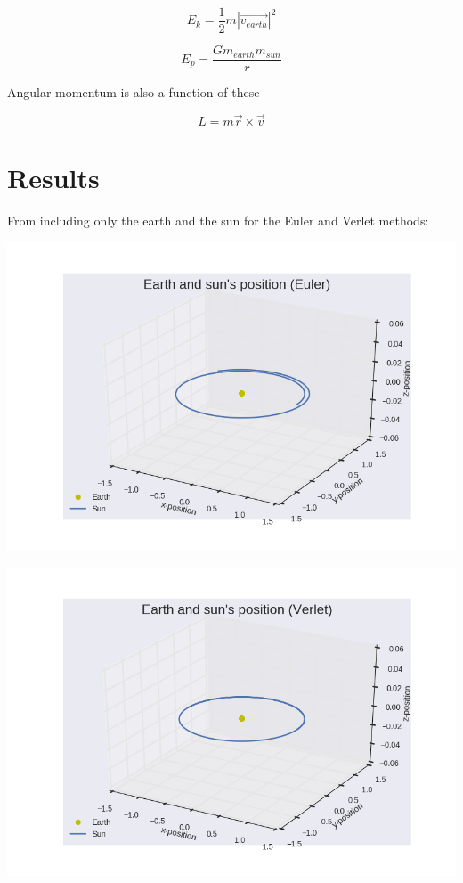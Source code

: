 \documentclass[11pt]{article}
\begin{document}
\begin{flushleft}
\begin{flushleft}
\begin{equation}
E_k = \frac{1}{2} m |\vec{v_{earth}}|^2
\end{equation}

\begin{equation}
E_p = \frac{G m_{earth} m_{sun}}{r}
\end{equation}

Angular momentum is also a function of these

\begin{equation}
L = m \vec{r} \times \vec{v}
\end{equation}
\end{flushleft}

\section{Results}

\begin{flushleft}
From including only the earth and the sun for the Euler and Verlet methods:
\begin{center}
\includegraphics[scale=0.6]{fig1_euler.png}
\end{center}

\begin{center}
\includegraphics[scale=0.6]{fig1_verlet.png}
\end{center}
\end{flushleft}


\end{flushleft}
\end{document}
